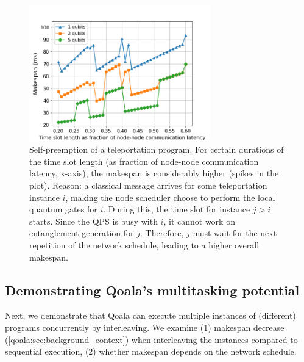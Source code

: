 \begin{figure}
    \centering
    \includegraphics[width=0.7\textwidth]{figures/qoala/teleport-self-preemption.png}
    \caption{Self-preemption of a teleportation program.
    For certain durations of the time slot length (as fraction of node-node communication latency, x-axis), the makespan is considerably higher (spikes in the plot).
    Reason: a classical message arrives for some teleportation instance $i$,
    making the node scheduler choose to perform the local quantum gates for $i$. During this,
    the time slot for instance $j > i$ starts. Since the QPS is busy with $i$, it cannot work on entanglement
    generation for $j$. Therefore, $j$ must wait for the next repetition of the network schedule, leading to a higher overall makespan.
    }
    \label{qoala:fig:teleport_self_preemption}
\end{figure}

\subsection{Demonstrating Qoala's multitasking potential}
\label{qoala:sec:demo_multitasking_potential}
Next, we demonstrate that Qoala can execute multiple instances of (different) programs concurrently by interleaving. We examine (1) makespan decrease (\cref{qoala:sec:background_context}) when interleaving the instances compared to sequential execution, %
(2) whether makespan depends on the network schedule.

